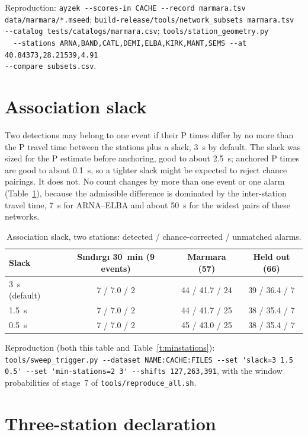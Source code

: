 \documentclass[11pt,a4paper]{article}
\newcommand{\tool}[1]{\nolinkurl{#1}}
\begin{document}
\noindent Reproduction: \tool{ayzek --scores-in CACHE --record marmara.tsv
data/marmara/*.mseed}; \tool{build-release/tools/network_subsets marmara.tsv
--catalog tests/catalogs/marmara.csv}; \tool{tools/station_geometry.py
  --stations ARNA,BAND,CATL,DEMI,ELBA,KIRK,MANT,SEMS --at 40.84373,28.21539,4.91
--compare subsets.csv}.

\clearpage
\section{Association slack}\label{s:slack}

Two detections may belong to one event if their P times differ by no more than
the P travel time between the stations plus a slack, 3~s by default. The slack
was sized for the P estimate before anchoring, good to about 2.5~s; anchored P
times are good to about 0.1~s, so a tighter slack might be expected to reject
chance pairings. It does not. No count changes by more than one event or one alarm (Table~\ref{t:slack}), because the admissible difference is dominated by
the inter-station travel time, 7~s for ARNA--ELBA and about 50~s for the
widest pairs of these networks.

\begin{table}[htbp]
  \centering\small
  \caption{Association slack, two stations: detected / chance-corrected /
  unmatched alarms.}\label{t:slack}
  \begin{tabular}{@{}lccc@{}}
    \toprule
    Slack & S\i{}nd\i{}rg\i{} 30~min (9 events) & Marmara (57) & Held out (66) \\
    \midrule
    3~s (default) & 7 / 7.0 / 2 & 44 / 41.7 / 24 & 39 / 36.4 / 7 \\
    1.5~s & 7 / 7.0 / 2 & 44 / 41.7 / 25 & 38 / 35.4 / 7 \\
    0.5~s & 7 / 7.0 / 2 & 45 / 43.0 / 25 & 38 / 35.4 / 7 \\
    \bottomrule
  \end{tabular}
\end{table}

\noindent Reproduction (both this table and Table~\ref{t:minstations}):
\tool{tools/sweep_trigger.py --dataset NAME:CACHE:FILES --set 'slack=3 1.5
0.5' --set 'min-stations=2 3' --shifts 127,263,391}, with the window
probabilities of stage~7 of \tool{tools/reproduce_all.sh}.

\section{Three-station declaration}\label{s:minstations}
\end{document}
